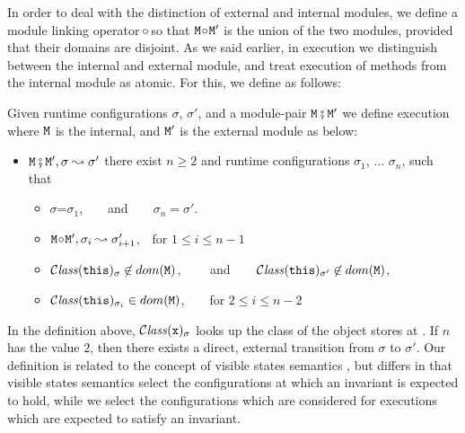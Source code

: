 In  order to deal with the distinction of external and internal modules, we define a module linking operator  $\!\circ\!$ so that
${\mbox{\tt{\ensuremath{{\mbox{\tt{M}}}}}}}\!\circ\!{\mbox{\tt{\ensuremath{{\mbox{\tt{M}}}}}}}'$ is the union of the two modules, provided that their domains are disjoint.
%
As we said earlier, in execution we distinguish  between the internal and external module, and treat  execution of 
methods from the internal module as atomic. For this, we define as follows:

\begin{definition}
\label{def:execution:internal:external}
\label{def:module_pair_execution} 
Given runtime configurations $\sigma$,  $\sigma'$,  and a module-pair ${\mbox{\tt{\ensuremath{{\mbox{\tt{M}}}}}}} \fatsemi {\mbox{\tt{\ensuremath{{\mbox{\tt{M}}}}}}}'$ we define
execution where ${\mbox{\tt{\ensuremath{{\mbox{\tt{M}}}}}}}$ is the internal, and ${\mbox{\tt{\ensuremath{{\mbox{\tt{M}}}}}}}'$ is the external module as below:
 
\begin{itemize}
\item
${\mbox{\tt{\ensuremath{{\mbox{\tt{M}}}}}}} \fatsemi {\mbox{\tt{\ensuremath{{\mbox{\tt{M}}}}}}}', \sigma \leadsto \sigma'$ \IFF
there exist  $n\geq 2$ and runtime configurations $\sigma_1$,  ...
$\sigma_n$, such that
\begin{itemize}
\item
$\sigma$=$\sigma_1$,\ \  \ \ and\ \ \ \ $\sigma_n=\sigma'$.
\item
${\mbox{\tt{\ensuremath{{\mbox{\tt{M}}}}}}} \!\circ\! {\mbox{\tt{\ensuremath{{\mbox{\tt{M}}}}}}}', \sigma_i \leadsto \sigma_{i+1}'$,\  \  for $1\leq i \leq n\!-\!1$
\item
${\mathcal C}{\mathit{lass}}({\mbox{\tt{this}}})_{\sigma}\not\in dom({{\mbox{\tt{\ensuremath{{\mbox{\tt{M}}}}}}}})$,  \ \  \ \ and\ \ \ \
${\mathcal C}{\mathit{lass}}({\mbox{\tt{this}}})_{\sigma'} \not\in dom({{\mbox{\tt{\ensuremath{{\mbox{\tt{M}}}}}}}})$,
\item
 ${\mathcal C}{\mathit{lass}}({\mbox{\tt{this}}})_{\sigma_i} \in dom({{\mbox{\tt{\ensuremath{{\mbox{\tt{M}}}}}}}})$,\ \ \ \ for $2\leq i \leq n\!-\!2$
\end{itemize}
\end{itemize}

\end{definition}

In the definition above,  ${\mathcal C}{\mathit{lass}}({\mbox{\tt{x}}})_{\sigma} $ looks up the class of the object stores at \x{}.
If  $n$  has the value $2$, %
then  there exists a direct, external transition from $\sigma$ to
$\sigma'$.  Our definition is related to the concept of visible states
semantics \cite{MuellerPoetzsch-HeffterLeavens06}, but differs in that
visible states semantics select the configurations at which an
invariant is expected to hold, while we select the configurations
which are
considered for executions which are expected to satisfy an invariant.


